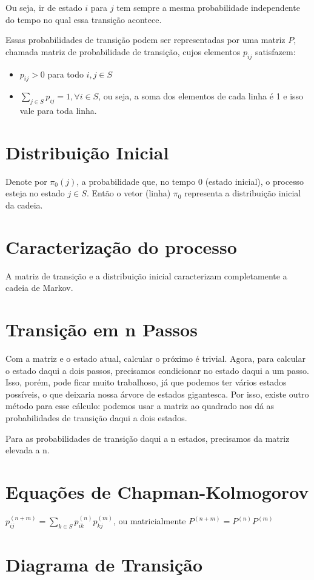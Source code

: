 \documentclass[11pt]{article}
\begin{document}
Ou seja, ir de estado \(i\) para \(j\) tem sempre a mesma probabilidade independente do tempo no qual essa transição acontece.

Essas probabilidades de transição podem ser representadas por uma matriz \(P\), chamada matriz de probabilidade de transição, cujos elementos \(p_{ij}\) satisfazem:

\begin{itemize}
\item \(p_{ij} > 0\) para todo \(i, j \in S\)
\item \(\displaystyle\sum_{j \in S} p_{ij} = 1, \forall i \in S\), ou seja, a soma dos elementos de cada linha é 1 e isso vale para toda linha.
\end{itemize}
\section{Distribuição Inicial}
\label{sec:orge1a2af9}
Denote por \(\pi_0(j)\), a probabilidade que, no tempo 0 (estado inicial), o processo esteja no estado \(j \in S\).
Então o vetor (linha) \(\pi_0\) representa a distribuição inicial da cadeia.

\section{Caracterização do processo}
\label{sec:org8dcb64a}
A matriz de transição e a distribuição inicial caracterizam completamente a cadeia de Markov.

\section{Transição em n Passos}
\label{sec:org8efb36e}
Com a matriz e o estado atual, calcular o próximo é trivial. Agora, para calcular o estado daqui a dois passos, precisamos condicionar no estado daqui a um passo. Isso, porém, pode ficar muito trabalhoso, já que podemos ter vários estados possíveis, o que deixaria nossa árvore de estados gigantesca. Por isso, existe outro método para esse cálculo: podemos usar a matriz ao quadrado nos dá as probabilidades de transição daqui a dois estados.

Para as probabilidades de transição daqui a n estados, precisamos da matriz elevada a n.

\section{Equações de Chapman-Kolmogorov}
\label{sec:orgb60fe62}
\(p^{(n+m)}_{ij} = \displaystyle\sum_{k \in S} p^{(n)}_{ik}p^{(m)}_{kj}\), ou matricialmente \(P^{(n+m)} = P^{(n)}P^{(m)}\)

\section{Diagrama de Transição}
\label{sec:org02fb1fd}
\end{document}
